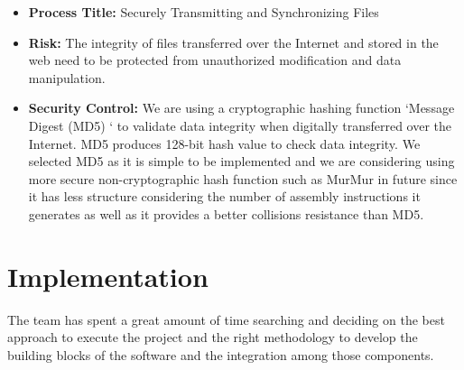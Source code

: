 \documentclass{article}
\begin{document}
\begin{enumerate}
\begin{itemize}
\item \textbf{Process Title:} Securely Transmitting and Synchronizing Files
\item \textbf{Risk:} The integrity of files transferred over the Internet and stored in the web need to be protected from unauthorized modification and data manipulation.
\item \textbf{Security Control:} We are using a cryptographic hashing function ‘Message Digest (MD5) ‘ to validate data integrity when digitally transferred over the Internet. MD5 produces 128-bit hash value to check data integrity. We selected MD5 as it is simple to be implemented and we are considering using more secure non-cryptographic hash function such as MurMur in future since it has less structure considering the number of assembly instructions it generates as well as it provides a better collisions resistance than MD5.

\end{itemize}

\end{enumerate}

\section{Implementation}
The team has spent a great amount of time searching and deciding on the best approach to execute the project and the right methodology to develop the building blocks of the software and the integration among those components.
\end{document}
